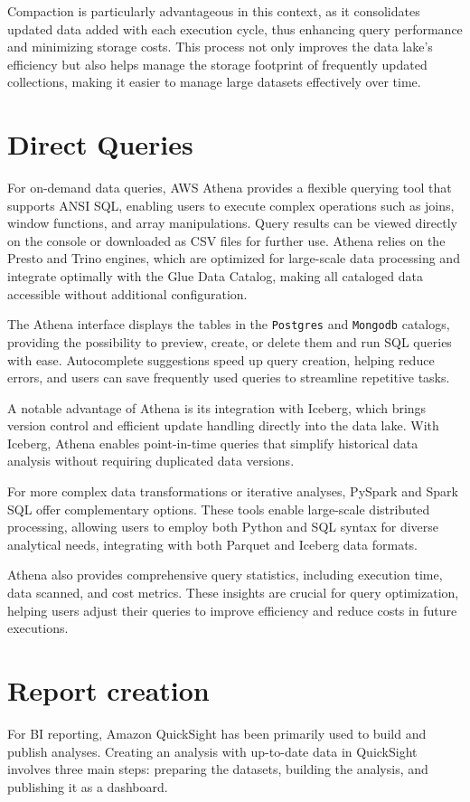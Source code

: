 Compaction is particularly advantageous in this context, as it consolidates updated data added with each execution cycle, thus enhancing query performance and minimizing storage costs. This process not only improves the data lake's efficiency but also helps manage the storage footprint of frequently updated collections, making it easier to manage large datasets effectively over time.

\section{Direct Queries}
For on-demand data queries, \ac{AWS} Athena provides a flexible querying tool that supports ANSI \ac{SQL}, enabling users to execute complex operations such as joins, window functions, and array manipulations. Query results can be viewed directly on the console or downloaded as \ac{CSV} files for further use. Athena relies on the Presto and Trino engines, which are optimized for large-scale data processing and integrate optimally with the Glue Data Catalog, making all cataloged data accessible without additional configuration.

The Athena interface displays the tables in the \texttt{Postgres} and \texttt{Mongodb} catalogs, providing the possibility to preview, create, or delete them and run \ac{SQL} queries with ease. Autocomplete suggestions speed up query creation, helping reduce errors, and users can save frequently used queries to streamline repetitive tasks.

A notable advantage of Athena is its integration with Iceberg, which brings version control and efficient update handling directly into the data lake. With Iceberg, Athena enables point-in-time queries that simplify historical data analysis without requiring duplicated data versions.

For more complex data transformations or iterative analyses, PySpark and Spark SQL offer complementary options. These tools enable large-scale distributed processing, allowing users to employ both Python and \ac{SQL} syntax for diverse analytical needs, integrating with both Parquet and Iceberg data formats.

Athena also provides comprehensive query statistics, including execution time, data scanned, and cost metrics. These insights are crucial for query optimization, helping users adjust their queries to improve efficiency and reduce costs in future executions.
\section{Report creation}
For \ac{BI} reporting, Amazon QuickSight has been primarily used to build and publish analyses. Creating an analysis with up-to-date data in QuickSight involves three main steps: preparing the datasets, building the analysis, and publishing it as a dashboard.

